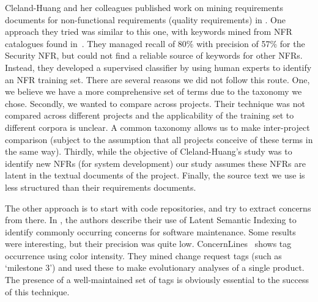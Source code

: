 \documentclass[10pt, conference, compsocconf]{IEEEtran}
\begin{document}
Cleland-Huang and her colleagues published work on mining requirements documents for non-functional requirements (quality requirements) in \cite{Cleland-Huang2006}. One approach they tried was similar to this one, with keywords mined from NFR catalogues found in~\cite{chung99}. They managed recall of 80\% with precision of 57\% for the Security NFR, but could not find a reliable source of keywords for other NFRs. Instead, they developed a supervised classifier by using human experts to identify an NFR training set. There are several reasons we did not follow this route. One, we believe we have a more comprehensive set of terms due to the taxonomy we chose. Secondly, we wanted to compare across projects. Their technique was not compared across different projects and the applicability of the training set to different corpora is unclear. A common taxonomy allows us to make inter-project comparison (subject to the assumption that all projects conceive of these terms in the same way). Thirdly, while the objective of Cleland-Huang's study was to identify new NFRs (for system development) our study assumes these NFRs are latent in the textual documents of the project. 
Finally, the source text we use is less structured than their requirements documents.

The other approach is to start with code repositories, and try to extract concerns from there. In \cite{marcus04wcre}, the authors describe their use of Latent Semantic Indexing to identify commonly occurring concerns for software maintenance. Some results were interesting, but their precision was quite low. ConcernLines~\cite{treude09cl} shows tag occurrence using color intensity. They mined change request tags (such as `milestone 3') and used these to make evolutionary analyses of a single product. The presence of a well-maintained set of tags is obviously essential to the success of this technique.

\end{document}
